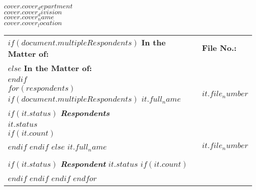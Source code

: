 \documentclass[12pt]{letter}
\begin{document}
\begin{letter}{}

\begin{center}
    \textbf{$cover.cover_department$} \\
    \textbf{$cover.cover_division$} \\
    \textbf{$cover.cover_name$} \\
    \textbf{$cover.cover_location$}
\end{center}

\renewcommand{\arraystretch}{1.2}  %

\vspace{2em}
\makebox[0.5\textwidth]{\hrulefill}
\begin{flushleft}
    \begin{tabular}{ p{} | p{} }
      $if(document.multipleRespondents)$
        \textbf{In the Matter of:} & \textbf{\hspace{1em}File No.:} \\
      $else$
        \textbf{In the Matter of:} \\
      $endif$ 
      \vspace{.0em} & \\ 
      $for(respondents)$
        $if(document.multipleRespondents)$
          \textbf{$it.full_name$} & \textbf{\hspace{1em}$it.file_number$} \\
          $if(it.status)$ 
            \textit{\textbf{Respondents}} & \\
            \textbf{$it.status$} & \\
            $if(it.count)$ 
              & \\
            $endif$
          $endif$
        $else$
          \textbf{$it.full_name$} & \textbf{\hspace{1em}$it.file_number$} \\ \\
          $if(it.status)$ 
            \textit{\textbf{Respondent}} 
            \textbf{$it.status$}
            $if(it.count)$ 
              \vspace{.25em} & \\
            $endif$
          $endif$
        $endif$    
      $endfor$
    \end{tabular}
\end{flushleft}
\makebox[0.5\textwidth]{\hrulefill}
 
\vspace{1em}


\end{letter}
\end{document}
